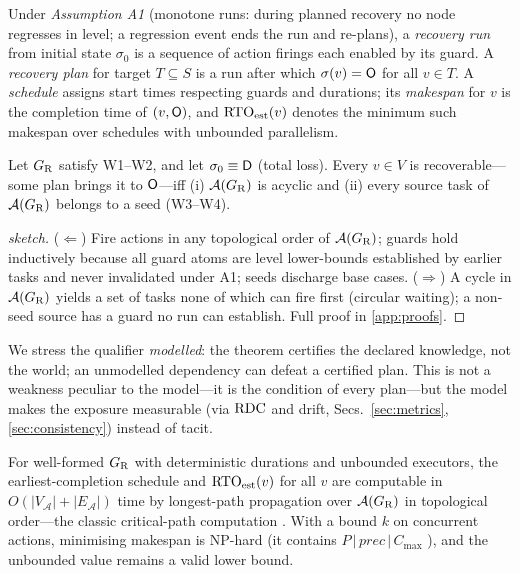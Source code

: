 \begin{definition}
\label{def:plan}
Under \emph{Assumption A1} (monotone runs: during planned recovery no node regresses in level; a regression event ends the run and re-plans), a \emph{recovery run} from initial state $\sigma_0$ is a sequence of action firings each enabled by its guard. A \emph{recovery plan} for target $T \subseteq S$ is a run after which $\sigma(v) = \mathsf{O}$ for all $v \in T$. A \emph{schedule} assigns start times respecting guards and durations; its \emph{makespan} for $v$ is the completion time of $(v,\mathsf{O})$, and $\mathrm{RTO}_{\mathrm{est}}(v)$ denotes the minimum such makespan over schedules with unbounded parallelism.
\end{definition}

\begin{theorem}
\label{thm:recoverability}
Let $G_{\mathrm{R}}$ satisfy W1--W2, and let $\sigma_0 \equiv \mathsf{D}$ (total loss). Every $v \in V$ is recoverable---some plan brings it to $\mathsf{O}$---iff (i) $\mathcal{A}(G_{\mathrm{R}})$ is acyclic and (ii) every source task of $\mathcal{A}(G_{\mathrm{R}})$ belongs to a seed (W3--W4).
\end{theorem}

\begin{proof}[sketch]
($\Leftarrow$) Fire actions in any topological order of $\mathcal{A}(G_{\mathrm{R}})$; guards hold inductively because all guard atoms are level lower-bounds established by earlier tasks and never invalidated under A1; seeds discharge base cases. ($\Rightarrow$) A cycle in $\mathcal{A}(G_{\mathrm{R}})$ yields a set of tasks none of which can fire first (circular waiting); a non-seed source has a guard no run can establish. Full proof in \ref{app:proofs}. \qedhere
\end{proof}

We stress the qualifier \emph{modelled}: the theorem certifies the declared knowledge, not the world; an unmodelled dependency can defeat a certified plan. This is not a weakness peculiar to the model---it is the condition of every plan---but the model makes the exposure measurable (via $\mathrm{RDC}$ and drift, Secs.~\ref{sec:metrics}, \ref{sec:consistency}) instead of tacit.

\begin{proposition}
\label{prop:schedule}
For well-formed $G_{\mathrm{R}}$ with deterministic durations and unbounded executors, the earliest-completion schedule and $\mathrm{RTO}_{\mathrm{est}}(v)$ for all $v$ are computable in $O(|V_{\mathcal{A}}| + |E_{\mathcal{A}}|)$ time by longest-path propagation over $\mathcal{A}(G_{\mathrm{R}})$ in topological order---the classic critical-path computation \citep{kelley1959critical}. With a bound $k$ on concurrent actions, minimising makespan is NP-hard (it contains $P\,|\,\mathit{prec}\,|\,C_{\max}$ \citep{ullman1975np}), and the unbounded value remains a valid lower bound.
\end{proposition}

